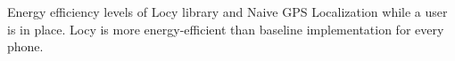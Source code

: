 Energy efficiency levels of Locy library and Naive GPS Localization while a user is in place. Locy is more energy-efficient than baseline implementation for every phone.
